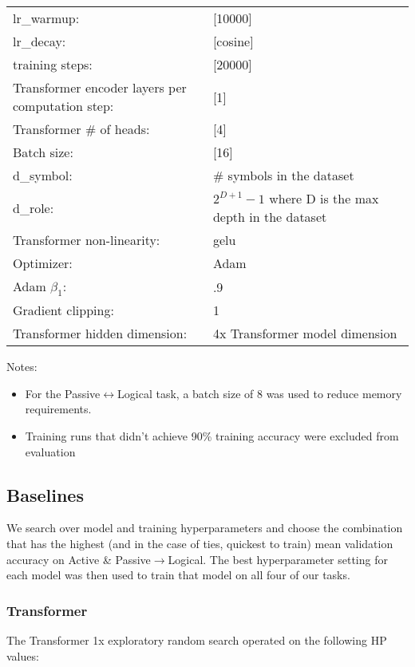 \begin{tabular}{ll}
    lr\_warmup: & [10000] \\
     lr\_decay: & [cosine] \\
     training steps: & [20000] \\
     Transformer encoder layers per computation step: & [1] \\
     Transformer \# of heads: & [4] \\
     Batch size: & [16] \\
     d\_symbol: & \# symbols in the dataset \\
     d\_role: & $2^{D+1}-1$ where D is the max depth in the dataset \\
     Transformer non-linearity: & gelu \\
     Optimizer: & Adam \\
     Adam $\beta_1$: & .9 \\
     Gradient clipping: & 1 \\
     Transformer hidden dimension: & 4x Transformer model dimension \\
\end{tabular}

Notes:

\begin{itemize}
\item For the Passive$\leftrightarrow$Logical task, a batch size of 8 was used to reduce memory requirements. 
\item Training runs that didn't achieve 90\% training accuracy were excluded from evaluation 
\end{itemize}

\pagebreak
\subsection{Baselines}

We search over model and training hyperparameters and choose the combination that has the highest (and in the case of ties, quickest to train) mean validation accuracy on Active \& Passive$\rightarrow$Logical. The best hyperparameter setting for each model was then used to train that model on all four of our tasks.  


\subsubsection{Transformer}

The Transformer 1x exploratory random search operated on the following HP values: 

